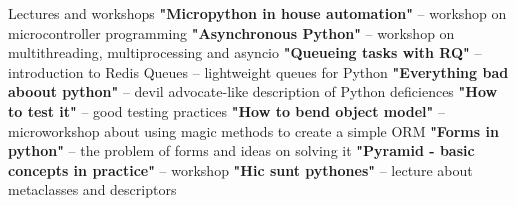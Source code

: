 \begin{rubric}{Lectures and workshops}
\entry*[PyConPL 2017]\textbf{"Micropython in house automation"} -- workshop
    on microcontroller programming
\entry*[PyConPL 2015]\textbf{"Asynchronous Python"} -- workshop
    on multithreading, multiprocessing and asyncio
\textbf{"Queueing tasks with RQ"} -- introduction
    to Redis Queues -- lightweight queues for Python
\entry*[PyConPL 2014]\textbf{"Everything bad aboout python"} --
    devil advocate-like description of Python deficiences
\entry*[PyConPL 2013]\textbf{"How to test it"} -- good testing practices
\entry*[4developers 2013]\textbf{"How to bend object model"} -- microworkshop
    about using magic methods to create a simple ORM
\entry*[PyConPL 2012]\textbf{"Forms in python"} -- the problem of forms
    and ideas on solving it
\entry*[PyconPL 2012]\textbf{"Pyramid - basic concepts in practice"} --
    workshop
\entry*[PyConPL 2011]\textbf{"Hic sunt pythones"} -- lecture about metaclasses
    and descriptors
\end{rubric}
